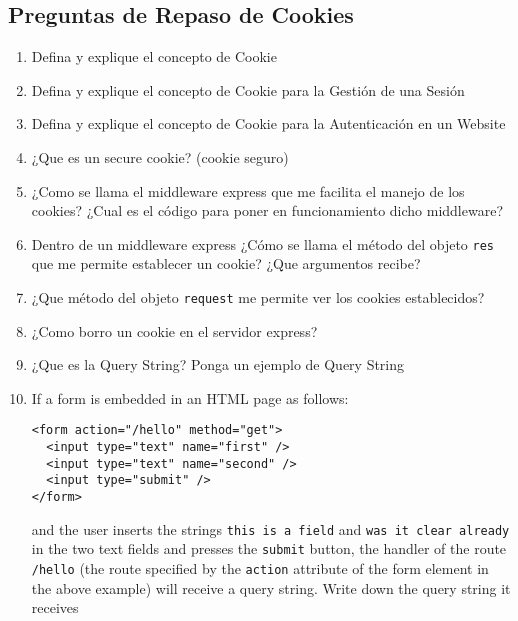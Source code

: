 \subsection{Preguntas de Repaso de
Cookies}\label{preguntas-de-repaso-de-cookies}

\begin{enumerate}
\def\labelenumi{\arabic{enumi}.}
\item
  Defina y explique el concepto de Cookie
\item
  Defina y explique el concepto de Cookie para la Gestión de una Sesión
\item
  Defina y explique el concepto de Cookie para la Autenticación en un
  Website
\item
  ¿Que es un secure cookie? (cookie seguro) 
\item
  ¿Como se llama el middleware express que me facilita el manejo de los
  cookies? ¿Cual es el código para poner en funcionamiento dicho
  middleware? 
\item
  Dentro de un middleware express ¿Cómo se llama el método del objeto
  \texttt{res} que me permite establecer un cookie? ¿Que argumentos
  recibe? 
\item
  ¿Que método del objeto \texttt{request} me permite ver los cookies
  establecidos? 
\item
  ¿Como borro un cookie en el servidor express? 
\item
  ¿Que es la Query String? Ponga un ejemplo de Query String 
\item
  If a form is embedded in an HTML page as follows:

\begin{verbatim}
<form action="/hello" method="get">
  <input type="text" name="first" />
  <input type="text" name="second" />
  <input type="submit" />
</form>
\end{verbatim}

  and the user inserts the strings \texttt{this is a field} and
  \texttt{was it clear already} in the two text fields and presses the
  \texttt{submit} button, the handler of the route \texttt{/hello} (the
  route specified by the \texttt{action} attribute of the form element
  in the above example) will receive a query string. Write down the
  query string it receives 
\end{enumerate}
